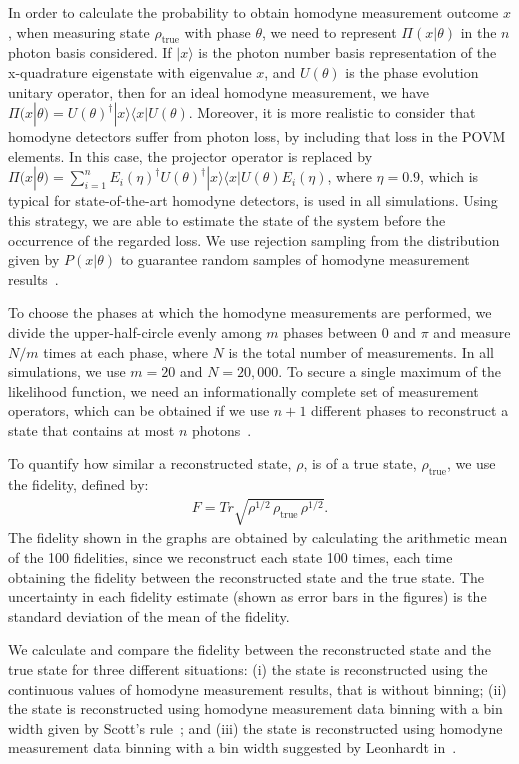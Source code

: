 \documentclass[
reprint,
superscriptaddress,
showpacs,
amsmath,
amssymb,
aps,
pra,
longbibliography
]{revtex4-1}
\begin{document}
In order to calculate the probability to obtain homodyne measurement outcome $x$, when measuring state $\rho_{\mathrm{true}}$ 
with phase $\theta$, we need to represent $\Pi (x|\theta)$ in the $n$ photon basis considered. If $|x\rangle$ is the photon 
number basis representation of the x-quadrature eigenstate with eigenvalue $x$, and $U(\theta)$ is the phase evolution unitary 
operator, then for an ideal homodyne measurement, we have $\Pi (x|\theta) = U(\theta)^{\dagger}|x\rangle \langle x| U(\theta)$. 
Moreover, it is more realistic to consider that homodyne detectors suffer from photon loss, by including that loss in the POVM elements. 
In this case, the projector operator is replaced by $\Pi (x|\theta) = \sum_{i=1}^{n} E_i(\eta)^{\dagger} U(\theta)^{\dagger}|x\rangle \langle x| U(\theta) E_i(\eta)$, 
where $\eta = 0.9$, which is typical for state-of-the-art homodyne detectors, is used in all
simulations. Using this strategy, we are able to estimate the state of the system before the occurrence of the regarded loss. We use rejection
sampling from the distribution given by $P(x|\theta)$ to guarantee random samples of homodyne measurement results~\cite{Kennedy1980}.

To choose the phases at which the homodyne measurements are performed, we divide the upper-half-circle evenly among $m$ phases 
between 0 and $\pi$ and measure $N/m$ times at each phase, where $N$ is the total number of measurements. In all simulations, we 
use $m=20$ and $N = 20,000$. To secure a single maximum of the likelihood function, we need an informationally complete set of measurement 
operators, which can be obtained if we use $n+1$ different phases to reconstruct a state that contains at most $n$ photons~\cite{Leonhardt1997}. 

To quantify how similar a reconstructed state, $\rho$, is of a true state, $\rho_{\mathrm{true}}$, we use the fidelity, defined by:
\begin{eqnarray}
F = Tr \sqrt{\rho^{1/2}\, \rho_{\mathrm{true}} \, \rho^{1/2}}.
\end{eqnarray}  
The fidelity shown in the graphs are obtained by calculating the arithmetic mean of the 100 fidelities, since we reconstruct each state 100 times, 
each time obtaining the fidelity between the reconstructed state and the true state. The uncertainty in each fidelity estimate 
(shown as error bars in the figures) is the standard deviation of the mean of the fidelity.

We calculate and compare the fidelity between the reconstructed state and the true state for three different situations: (i) the state is 
reconstructed using the continuous values of homodyne measurement results, that is without binning; (ii) the state is reconstructed 
using homodyne measurement data binning with a bin width given by Scott's rule~\cite{Scott2010}; and (iii) the state is reconstructed 
using homodyne measurement data binning with a bin width suggested by Leonhardt in~\cite{Leonhardt1997}.
\end{document}

